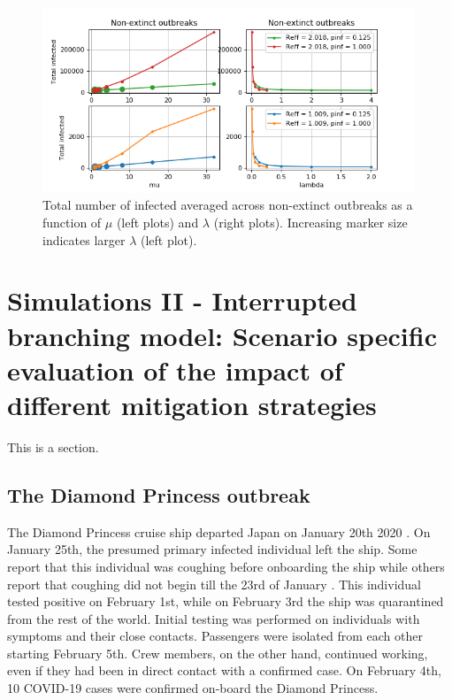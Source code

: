\documentclass[sr]{drdc-report}
\begin{document}
\begin{figure}
  \includegraphics[width=0.99\textwidth, keepaspectratio=true]{figures/NinfOut_exp1}
  \caption{Total number of infected averaged across non-extinct outbreaks as a function of $\mu$ (left plots) and $\lambda$ (right plots). Increasing marker size indicates larger $\lambda$  (left plot).}\label{fig_plt_NinfOutExp1}
\end{figure}

\newpage

\section{Simulations II - Interrupted branching model: Scenario specific evaluation of the impact of different mitigation strategies}\label{Scenario_II_section_label}
This is a section.

\subsection{The Diamond Princess outbreak}

The Diamond Princess cruise ship departed Japan on January 20th 2020 \cite{10..15585/mmwr..mm6912e3}. On January 25th, the presumed primary infected individual left the ship. Some report that this individual was coughing before onboarding the ship \cite{10..1016/j..ijid..2020..02..033} while others report that coughing did not begin till the 23rd of January \cite{news_patient_zero}. This individual tested positive on February 1st, while on February 3rd the ship was quarantined from the rest of the world. Initial testing was performed on individuals with symptoms and their close contacts. Passengers were isolated from each other starting February 5th. Crew members, on the other hand, continued working, even if they had been in direct contact with a confirmed case. On February 4th, 10 COVID-19 cases were confirmed on-board the Diamond Princess.
\end{document}
